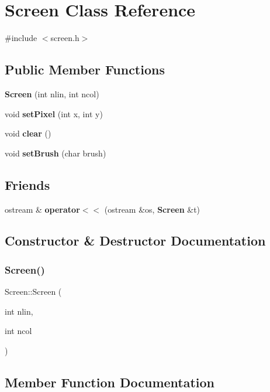 \section{Screen Class Reference}
\label{class_screen}


{\ttfamily \#include $<$screen.\+h$>$}

\subsection*{Public Member Functions}
\begin{DoxyCompactItemize}
\item 
\textbf{ Screen} (int nlin, int ncol)
\item 
void \textbf{ set\+Pixel} (int x, int y)
\item 
void \textbf{ clear} ()
\item 
void \textbf{ set\+Brush} (char brush)
\end{DoxyCompactItemize}
\subsection*{Friends}
\begin{DoxyCompactItemize}
\item 
ostream \& \textbf{ operator$<$$<$} (ostream \&os, \textbf{ Screen} \&t)
\end{DoxyCompactItemize}


\subsection{Constructor \& Destructor Documentation}
\mbox{\label{class_screen_a246eac542489ef06335800fae60827ee}} 
\subsubsection{Screen()}
{\footnotesize\ttfamily Screen\+::\+Screen (\begin{DoxyParamCaption}\item[{int}]{nlin,  }\item[{int}]{ncol }\end{DoxyParamCaption})}



\subsection{Member Function Documentation}
\mbox{\label{class_screen_a35e74266b2a04e37b354ceff7a5f1031}} 
